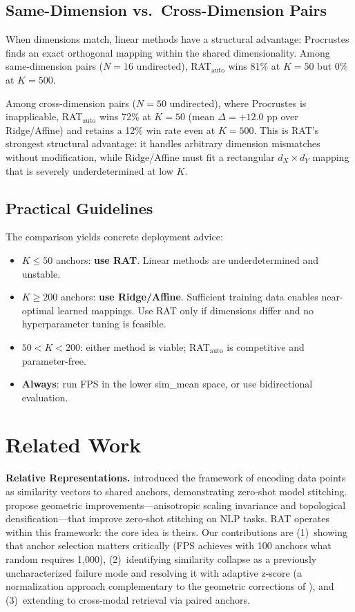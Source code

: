 \documentclass{article}
\begin{document}
\subsection{Same-Dimension vs.\ Cross-Dimension Pairs}

When dimensions match, linear methods have a structural advantage: Procrustes finds an exact orthogonal mapping within the shared dimensionality.  Among same-dimension pairs ($N{=}16$ undirected), RAT$_\text{auto}$ wins 81\% at $K{=}50$ but 0\% at $K{=}500$.

Among cross-dimension pairs ($N{=}50$ undirected), where Procrustes is inapplicable, RAT$_\text{auto}$ wins 72\% at $K{=}50$ (mean $\Delta{=}{+}12.0$ pp over Ridge/Affine) and retains a 12\% win rate even at $K{=}500$.  This is RAT's strongest structural advantage: it handles arbitrary dimension mismatches without modification, while Ridge/Affine must fit a rectangular $d_X \times d_Y$ mapping that is severely underdetermined at low $K$.

\subsection{Practical Guidelines}

The comparison yields concrete deployment advice:
\begin{itemize}
  \item $K \le 50$ anchors: \textbf{use RAT}.  Linear methods are underdetermined and unstable.
  \item $K \ge 200$ anchors: \textbf{use Ridge/Affine}.  Sufficient training data enables near-optimal learned mappings.  Use RAT only if dimensions differ and no hyperparameter tuning is feasible.
  \item $50 < K < 200$: either method is viable; RAT$_\text{auto}$ is competitive and parameter-free.
  \item \textbf{Always}: run FPS in the lower sim\_mean space, or use bidirectional evaluation.
\end{itemize}

\section{Related Work}
\label{sec:related}

\textbf{Relative Representations.} \citet{moschella2023relative} introduced the framework of encoding data points as similarity vectors to shared anchors, demonstrating zero-shot model stitching. \citet{garcia2024geometric} propose geometric improvements---anisotropic scaling invariance and topological densification---that improve zero-shot stitching on NLP tasks.  RAT operates within this framework: the core idea is theirs. Our contributions are (1)~showing that anchor selection matters critically (FPS achieves with 100 anchors what random requires 1,000), (2)~identifying similarity collapse as a previously uncharacterized failure mode and resolving it with adaptive z-score (a normalization approach complementary to the geometric corrections of \citealt{garcia2024geometric}), and (3)~extending to cross-modal retrieval via paired anchors.
\end{document}
